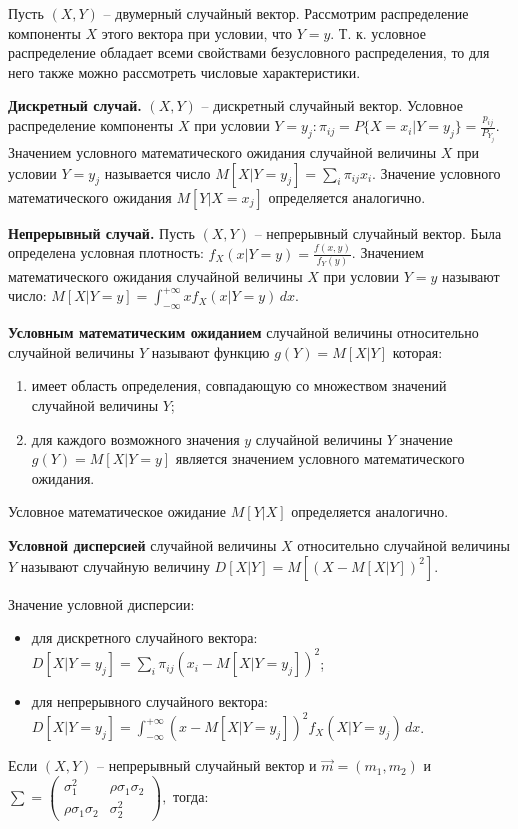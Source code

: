 Пусть $(X, Y)$ -- двумерный случайный вектор. Рассмотрим распределение компоненты $X$ этого вектора при условии, что $Y = y$. Т. к. условное распределение обладает всеми свойствами безусловного распределения, то для него также можно рассмотреть числовые характеристики.

\textbf{Дискретный случай.} $(X, Y)$ -- дискретный случайный вектор. Условное распределение компоненты $X$ при условии $Y = y_j: \pi_{ij} = P\{X = x_i | Y = y_j\} = \frac{p_{ij}}{P_{Y_j}}$. Значением условного математического ожидания случайной величины $X$ при условии $Y = y_j$ называется число $M[X|Y = y_j] = \sum_{i} \pi_{ij} x_i$. Значение условного математического ожидания $M[Y|X = x_j]$ определяется аналогично.

\textbf{Непрерывный случай.} Пусть $(X, Y)$ -- непрерывный случайный вектор. Была определена условная плотность: $f_X(x | Y = y) = \frac{f(x, y)}{f_Y(y)}$. Значением математического ожидания случайной величины $X$ при условии $Y = y$ называют число: $M[X|Y = y] = \int_{-\infty}^{+\infty} x f_X(x | Y = y) \, dx$.

\textbf{Условным математическим ожиданием} случайной величины относительно случайной величины $Y$ называют функцию $g(Y) = M[X|Y]$ которая:
\begin{enumerate}
	\item имеет область определения, совпадающую со множеством значений случайной величины $Y$;
	\item для каждого возможного значения $y$ случайной величины $Y$ значение $g(Y) = M[X|Y = y]$ является значением условного математического ожидания.
\end{enumerate}

Условное математическое ожидание $M[Y|X]$ определяется аналогично.

\textbf{Условной дисперсией} случайной величины $X$ относительно случайной величины $Y$ называют случайную величину $D[X|Y] = M[(X- M[X|Y])^2]$.

Значение условной дисперсии:
\begin{itemize}
	\item для дискретного случайного вектора: $D[X|Y = y_j] = \sum_{i} \pi_{ij} (x_i - M[X|Y = y_j])^2$;
	\item для непрерывного случайного вектора: $D[X|Y = y_j] = \int_{-\infty}^{+\infty} (x - M[X|Y = y_j])^2 f_X(X | Y = y_j) \, dx$.
\end{itemize}

Если $(X, Y)$ -- непрерывный случайный вектор и $\vec{m} = (m_1, m_2)$ и $\sum = \begin{pmatrix}
	\sigma_1^2 & \rho \sigma_1 \sigma_2 \\
	\rho \sigma_1 \sigma_2 & \sigma_2^2
\end{pmatrix},$ тогда:

